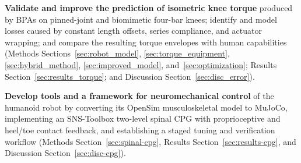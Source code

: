 
\item \textbf{Validate and improve the prediction of isometric knee torque} produced by BPAs on pinned-joint and biomimetic four-bar knees; identify and model losses caused by constant length offsets, series compliance, and actuator wrapping; and compare the resulting torque envelopes with human capabilities (Methods Sections~\ref{sec:robot_model}, \ref{sec:torque_equipment}, \ref{sec:hybrid_method}, \ref{sec:improved_model}, and~\ref{sec:optimization}; Results Section~\ref{sec:results_torque}; and Discussion Section~\ref{sec:disc_error}).

\item \textbf{Develop tools and a framework for neuromechanical control} of the humanoid robot by converting its OpenSim musculoskeletal model to MuJoCo, implementing an SNS-Toolbox two-level spinal CPG with proprioceptive and heel/toe contact feedback, and establishing a staged tuning and verification workflow (Methods Section~\ref{sec:spinal-cpg}, Results Section~\ref{sec:results-cpg}, and Discussion Section~\ref{sec:disc-cpg}).
